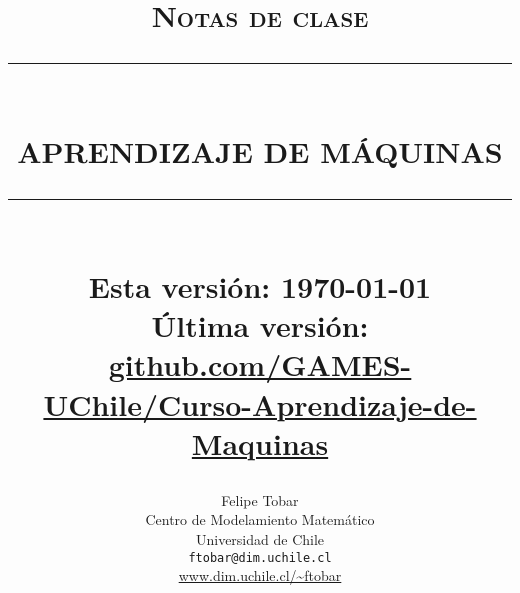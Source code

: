 
\newcommand{\HRule}[1]{\rule{\linewidth}{#1}} 	%

\makeatletter							%
\def\printtitle{%
    {\centering \@title\par}}
\makeatother									

\makeatletter							%
\def\printauthor{%
    {\centering \large \@author}}				
\makeatother							

\title{	\normalsize \textsc{Notas de clase} 	%
		 	\\[6.0cm]								%
			\HRule{0.5pt} \\						%
			 \textbf{\uppercase{\LARGE Aprendizaje de Máquinas}}	%
			\HRule{2pt} \\ [0.2cm]		%
			\large Esta versión: \today\\	[0.2cm]		%
			\large Última versión: \url{github.com/GAMES-UChile/Curso-Aprendizaje-de-Maquinas}
		}

\author{
		Felipe Tobar\\	
		Centro de Modelamiento Matemático\\	
		Universidad de Chile\\[1.0cm]
        \texttt{ftobar@dim.uchile.cl} \\
        \url{www.dim.uchile.cl/~ftobar} \\[1.0cm]
}
